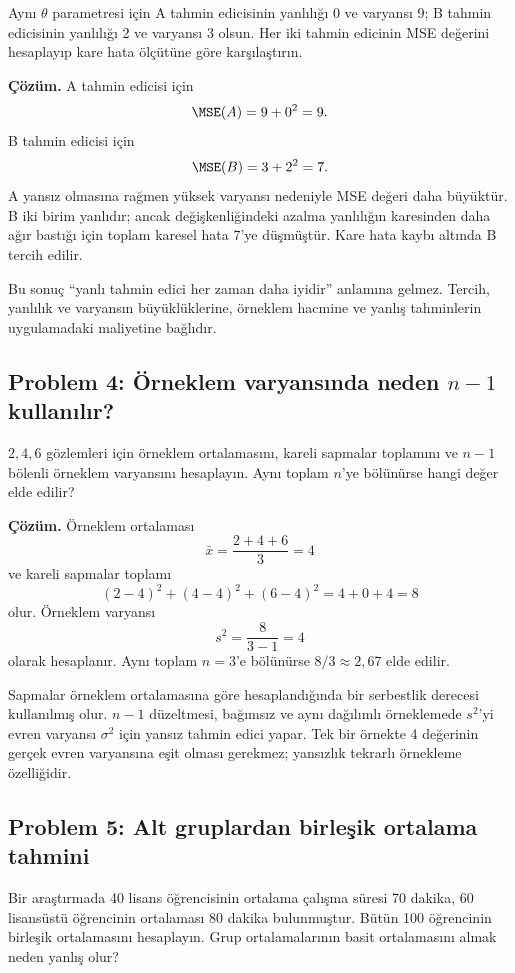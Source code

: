 Aynı $\theta$ parametresi için A tahmin edicisinin yanlılığı 0 ve varyansı 9;
B tahmin edicisinin yanlılığı 2 ve varyansı 3 olsun. Her iki tahmin edicinin
MSE değerini hesaplayıp kare hata ölçütüne göre karşılaştırın.

\textbf{Çözüm.} A tahmin edicisi için
\[
\MSE(A)=9+0^2=9.
\]
B tahmin edicisi için
\[
\MSE(B)=3+2^2=7.
\]
A yansız olmasına rağmen yüksek varyansı nedeniyle MSE değeri daha büyüktür.
B iki birim yanlıdır; ancak değişkenliğindeki azalma yanlılığın karesinden
daha ağır bastığı için toplam karesel hata 7'ye düşmüştür. Kare hata kaybı
altında B tercih edilir.

Bu sonuç ``yanlı tahmin edici her zaman daha iyidir'' anlamına gelmez. Tercih,
yanlılık ve varyansın büyüklüklerine, örneklem hacmine ve yanlış tahminlerin
uygulamadaki maliyetine bağlıdır.

\subsection*{Problem 4: Örneklem varyansında neden $n-1$ kullanılır?}

$2,4,6$ gözlemleri için örneklem ortalamasını, kareli sapmalar toplamını ve
$n-1$ bölenli örneklem varyansını hesaplayın. Aynı toplam $n$'ye bölünürse
hangi değer elde edilir?

\textbf{Çözüm.} Örneklem ortalaması
\[
\bar x=\frac{2+4+6}{3}=4
\]
ve kareli sapmalar toplamı
\[
(2-4)^2+(4-4)^2+(6-4)^2=4+0+4=8
\]
olur. Örneklem varyansı
\[
s^2=\frac{8}{3-1}=4
\]
olarak hesaplanır. Aynı toplam $n=3$'e bölünürse $8/3\approx2{,}67$ elde
edilir.

Sapmalar örneklem ortalamasına göre hesaplandığında bir serbestlik derecesi
kullanılmış olur. $n-1$ düzeltmesi, bağımsız ve aynı dağılımlı örneklemede
$s^2$'yi evren varyansı $\sigma^2$ için yansız tahmin edici yapar. Tek bir
örnekte 4 değerinin gerçek evren varyansına eşit olması gerekmez; yansızlık
tekrarlı örnekleme özelliğidir.

\subsection*{Problem 5: Alt gruplardan birleşik ortalama tahmini}

Bir araştırmada 40 lisans öğrencisinin ortalama çalışma süresi 70 dakika,
60 lisansüstü öğrencinin ortalaması 80 dakika bulunmuştur. Bütün 100
öğrencinin birleşik ortalamasını hesaplayın. Grup ortalamalarının basit
ortalamasını almak neden yanlış olur?

